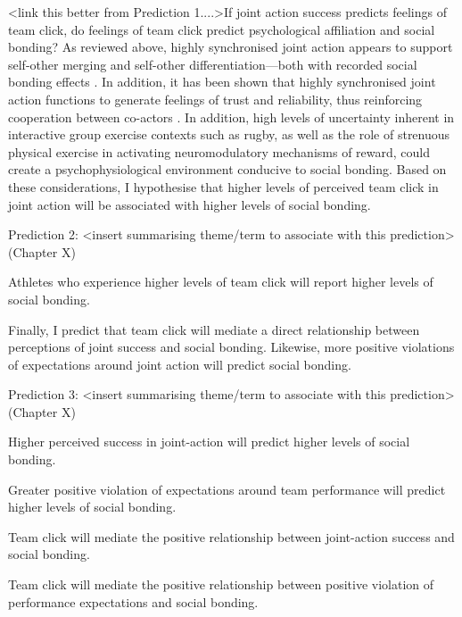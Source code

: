   \bigskip

   <link this better from Prediction 1....>If joint action success predicts feelings of team click, do feelings of team click predict psychological affiliation and social bonding? As reviewed above, highly synchronised joint action appears to support self-other merging and self-other differentiation---both with recorded social bonding effects \citep{Mogan2017,Milward2016}. In addition, it has been shown that highly synchronised joint action functions to generate feelings of trust and reliability, thus reinforcing cooperation between co-actors \citep{Reddish2013a}. In addition, high levels of uncertainty inherent in interactive group exercise contexts such as rugby, as well as the role of strenuous physical exercise in activating neuromodulatory mechanisms of reward, could create a psychophysiological environment conducive to social bonding.  Based on these considerations, I hypothesise that higher levels of perceived team click in joint action will be associated with higher levels of social bonding.
  \bigskip
  \begin{indent}
  \begin{description}
Prediction 2: <insert summarising theme/term to associate with this prediction> (Chapter X)
    \item [Prediction 2.a] Athletes who experience higher levels of team click will report higher levels of social bonding.
  \end{description}
  \end{indent}

  Finally, I predict that team click will mediate a direct relationship between perceptions of joint success and social bonding.  Likewise, more positive violations of expectations around joint action will predict social bonding.
  \bigskip
  \begin{indent}
  \begin{description}
Prediction 3: <insert summarising theme/term to associate with this prediction> (Chapter X)
    \item [Prediction 3.a] Higher perceived success in joint-action will predict higher levels of social bonding.
   \item [Prediction 3.b] Greater positive violation of expectations around team performance will predict higher levels of social bonding.
    \item [Prediction 4.a] Team click will mediate the positive relationship between joint-action success and social bonding.
    \item [Prediction 4.b] Team click will mediate the positive relationship between positive violation of performance expectations and social bonding.

  \end{description}
  \end{indent}

